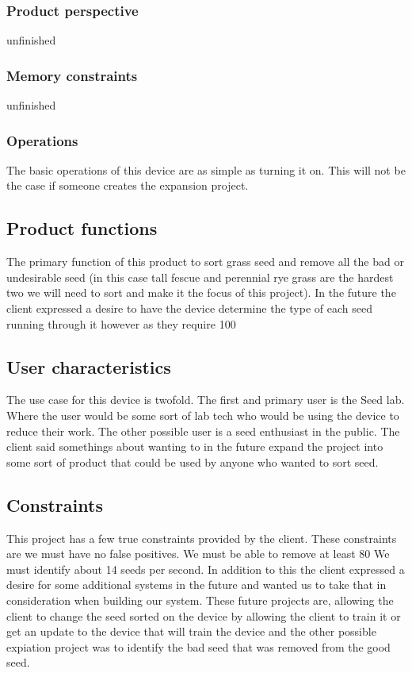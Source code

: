 \documentclass[onecolumn, draftclsnofoot,10pt, compsoc]{IEEEtran}
\begin{document}
\subsubsection{Product perspective}
unfinished

\subsubsection{Memory constraints}
unfinished
\subsubsection{Operations}
The basic operations of this device are as simple as turning it on.
This will not be the case if someone creates the expansion project.


\subsection{Product functions}
The primary function of this product to sort grass seed and remove all the bad or undesirable seed (in this case tall fescue and perennial rye grass are the hardest two we will need to sort and make it the focus of this project).
In the future the client expressed a desire to have the device determine the type of each seed running through it however as they require 100%

\subsection{User characteristics}
The use case for this device is twofold.
The first and primary user is the Seed lab.
Where the user would be some sort of lab tech who would be using the device to reduce their work.
The other possible user is a seed enthusiast in the public.
The client said somethings about wanting to in the future expand the project into some sort of product that could be used by anyone who wanted to sort seed.

\subsection{Constraints}
This project has a few true constraints provided by the client.
These constraints are we must have no false positives. We must be able to remove at least 80%
We must identify about 14 seeds per second.
In addition to this the client expressed a desire for some additional systems in the future and wanted us to take that in consideration when building our system.
These future projects are, allowing the client to change the seed sorted on the device by allowing the client to train it or get an update to the device that will train the device and the other possible expiation project was to identify the bad seed that was removed from the good seed.
\end{document}
